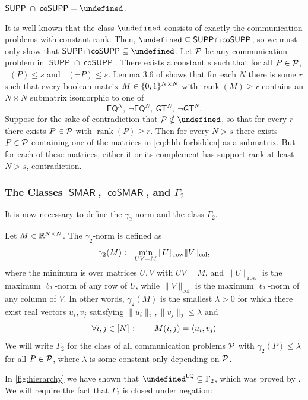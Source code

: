 \documentclass[conference]{IEEEtran}
\DeclareMathOperator{\suprank}{rank_0}
\DeclareMathOperator{\rank}{rank}
\newcommand{\cplxclass}[1]{\mathsf{#1}}
\let\P\undefined\DeclareMathOperator{\P}{\cplxclass{P}}
\DeclareMathOperator{\SUPP}{\cplxclass{SUPP}}
\DeclareMathOperator{\coSUPP}{\cplxclass{coSUPP}}
\DeclareMathOperator{\SMAR}{\cplxclass{SMAR}}
\DeclareMathOperator{\coSMAR}{\cplxclass{coSMAR}}
\newcommand{\EQ}{\mathsf{EQ}}
\newcommand{\GEQ}{\mathsf{GT}}
\begin{document}
\begin{proposition}\label{prop:supp-cap-cosupp}
$\SUPP\ \cap\ \coSUPP = \P$.
\end{proposition}
\begin{IEEEproof}
It is well-known that the class $\P$ consists of exactly the communication
problems with constant rank. Then, $\P \subseteq \SUPP \cap \coSUPP$, so we must
only show that $\SUPP \cap \coSUPP \subseteq \P$. Let $\mathcal{P}$ be any communication
problem in $\SUPP \cap \coSUPP$. There exists a constant $s$ such that
for all $P \in \mathcal{P}$, $\suprank(P) \leq s$ and $\suprank(\neg P) \leq s$. Lemma 3.6 of \cite{HHH23} shows that for each $N$ there is some $r$ such that
every boolean matrix $M \in \{0,1\}^{N \times N}$ with $\rank(M) \geq r$ contains an
$N \times N$ submatrix isomorphic to one of
\begin{equation}
\label{eq:hhh-forbidden}
    \EQ^N,\ \neg \EQ^N,\ \GEQ^N,\ \neg \GEQ^N .
\end{equation}
Suppose for the sake of contradiction that $\cP \notin \P$, so that for every
$r$ there exists $P \in \mathcal{P}$ with $\rank(P) \geq r$. Then for every $N > s$
there exists $P \in \mathcal{P}$ containing one of the matrices in
\cref{eq:hhh-forbidden} as a submatrix. But for each of these matrices, either it or its
complement has support-rank at least $N > s$, contradiction.
\end{IEEEproof}

\subsubsection{The Classes \texorpdfstring{$\SMAR$, $\coSMAR$, and $\Gamma_2$}{SMAR, coSMAR, and Γ₂}}

It is now necessary to define the $\gamma_2$-norm and the class $\Gamma_2$.
\begin{definition}
\label{def:gamma-2}
Let $M \in \mathbb{R}^{N \times N}$. The $\gamma_2$-norm is defined as
\[
    \gamma_2(M) \coloneqq \min_{UV = M} \|U\|_\text{row} \|V\|_\text{col} ,
\]
where the minimum is over matrices $U,V$ with $UV = M$, and $\|U\|_\text{row}$
is the maximum $\ell_2$-norm of any row of $U$, while $\|V\|_\text{col}$
is the maximum $\ell_2$-norm of any column of $V$. In other words, $\gamma_2(M)$ is the smallest
$\lambda > 0$ for which there exist real vectors $u_i, v_j$ satisfying $\|u_i\|_2, \|v_j\|_2 \leq \lambda$ and
\[
    \forall i,j \in [N] \;\colon\qquad M(i,j) = \langle u_i, v_j \rangle
\]
We will write $\Gamma_2$ for the class
of all communication problems $\mathcal{P}$ with $\gamma_2(P) \leq \lambda$ for all
$P \in \mathcal{P}$, where $\lambda$ is some constant only depending on $\mathcal{P}$.
\end{definition}
In \cref{fig:hierarchy} we have shown that $\P^\EQ \subseteq \Gamma_2$, which was
proved by \cite{HHH22}. We will require the fact that $\Gamma_2$ is closed under negation:
\end{document}
